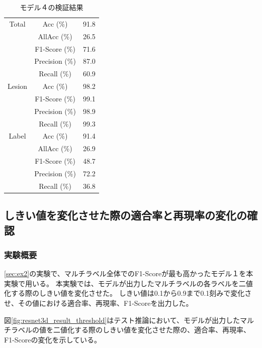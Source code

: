\begin{table}[tb]
    \caption[]{モデル４の検証結果}
    \label{tb:resnet3d_e_m}
    \centering
    \normalsize
    \begin{tabular}{c|c|r} \hline
        Total & Acc (\%) & 91.8 \\ \cline{2-3}
         & AllAcc (\%) & 26.5 \\ \cline{2-3}
         & F1-Score (\%) & 71.6 \\ \cline{2-3}
         & Precision (\%) & 87.0 \\ \cline{2-3}
         & Recall (\%) & 60.9 \\ \hline
        Lesion & Acc (\%) & 98.2 \\ \cline{2-3}
         & F1-Score (\%) & 99.1 \\ \cline{2-3}
         & Precision (\%) & 98.9 \\ \cline{2-3}
         & Recall (\%) & 99.3 \\ \hline
        Label & Acc (\%) & 91.4 \\ \cline{2-3}
         & AllAcc (\%) & 26.9 \\ \cline{2-3}
         & F1-Score (\%) & 48.7 \\ \cline{2-3}
         & Precision (\%) & 72.2 \\ \cline{2-3}
         & Recall (\%) & 36.8 \\ \hline
    \end{tabular}
\end{table}

\newpage
\subsection{しきい値を変化させた際の適合率と再現率の変化の確認}
\label{sec:ex22}
\subsubsection{実験概要}
\ref{sec:ex2}の実験で、マルチラベル全体でのF1-Scoreが最も高かったモデル１を本実験で用いる。
本実験では、モデルが出力したマルチラベルの各ラベルを二値化する際のしきい値を変化させた。
しきい値は0.1から0.9まで0.1刻みで変化させ、その値における適合率、再現率、F1-Scoreを出力した。

図\ref{fig:resnet3d_result_threshold}はテスト推論において、モデルが出力したマルチラベルの値を二値化する際のしきい値を変化させた際の、適合率、再現率、F1-Scoreの変化を示している。

